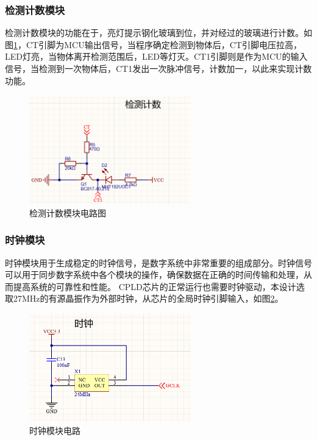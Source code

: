     \subsubsection{检测计数模块}
    检测计数模块的功能在于，亮灯提示钢化玻璃到位，并对经过的玻璃进行计数。如图\ref{检测计数模块电路图}，CT引脚为MCU输出信号，当程序确定检测到物体后，CT引脚电压拉高，LED灯亮，当物体离开检测范围后，LED等灯灭。CT1引脚则是作为MCU的输入信号，当检测到一次物体后，CT1发出一次脉冲信号，计数加一，以此来实现计数功能。
    \begin{figure}[ht]
        \centering
        \includegraphics[width=7cm]{figure/detection count circuit.png}
        \caption{检测计数模块电路图}
        \label{检测计数模块电路图}
    \end{figure}
    
    
    \subsubsection{时钟模块}
    时钟模块用于生成稳定的时钟信号，是数字系统中非常重要的组成部分。时钟信号可以用于同步数字系统中各个模块的操作，确保数据在正确的时间传输和处理，从而提高系统的可靠性和性能。
    CPLD芯片的正常运行也需要时钟驱动，本设计选取27MHz的有源晶振作为外部时钟，从芯片的全局时钟引脚输入，如图\ref{时钟模块电路}。
    \begin{figure}[ht]
        \centering
        \includegraphics[width=7cm]{figure/clock circuit.png}
        \caption{时钟模块电路}
        \label{时钟模块电路}
    \end{figure}
    
